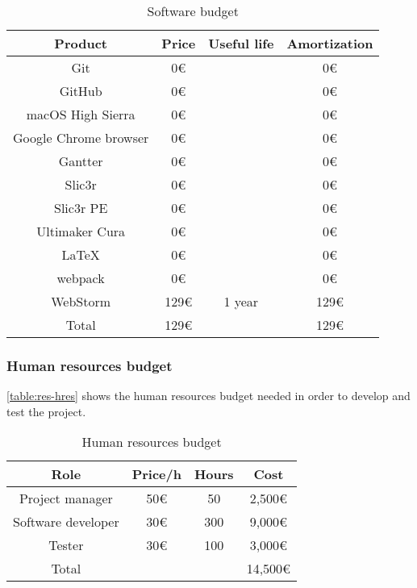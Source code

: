 \begin{table}[h!]
\centering
\begin{tabular}{ |c|c|c|c| } 
    \hline
    Product & Price & Useful life & Amortization \\
    \hline
    \hline
    Git & 0€ & & 0€ \\ 
    \hline
    GitHub & 0€ & & 0€ \\ 
    \hline
    macOS High Sierra & 0€ & & 0€ \\ 
    \hline
    Google Chrome browser & 0€ & & 0€ \\ 
    \hline
    Gantter & 0€ & & 0€ \\ 
    \hline
    Slic3r & 0€ & & 0€ \\ 
    \hline
    Slic3r PE & 0€ & & 0€ \\ 
    \hline
    Ultimaker Cura & 0€ & & 0€ \\ 
    \hline
    \LaTeX & 0€ & & 0€ \\ 
    \hline
    webpack & 0€ & & 0€ \\ 
    \hline
    WebStorm & 129€ & 1 year & 129€ \\ 
    \hline
    \hline
    Total & 129€ & & 129€ \\
    \hline
\end{tabular}
\caption{Software budget}\label{table:res-sw}
\end{table}


\subsubsection{Human resources budget}

\autoref{table:res-hres}
shows the human resources budget needed in order to develop and test the project.

\begin{table}[h!]
\centering
\begin{tabular}{ |c|c|c|c| } 
    \hline
    Role & Price/h & Hours & Cost \\
    \hline
    \hline
    Project manager & 50€ & 50 & 2,500€ \\
    \hline
    Software developer & 30€ & 300 & 9,000€ \\
    \hline
    Tester & 30€ & 100 & 3,000€ \\
    \hline
    \hline
    Total & & & 14,500€ \\
    \hline
\end{tabular}
\caption{Human resources budget}\label{table:res-hres}
\end{table}


